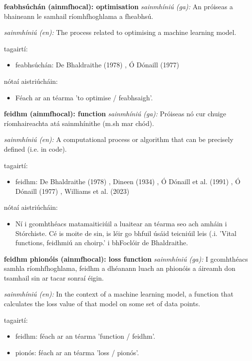 \documentclass{article}
\begin{document}
\textbf{feabhsúchán (ainmfhocal): optimisation}
\textit{sainmhíniú (ga):} An próiseas a bhaineann le samhail ríomhfhoghlama a fheabhsú.

\textit{sainmhíniú (en):} The process related to optimising a machine learning model.

tagairtí:
\begin{itemize}
	\item feabhsúchán: De Bhaldraithe (1978) \cite{de-bhaldraithe}, Ó Dónaill (1977) \cite{odonaill}
\end{itemize}

nótaí aistriúcháin:
\begin{itemize}
	\item Féach ar an téarma 'to optimise / feabhsaigh'.
\end{itemize}


\textbf{feidhm (ainmfhocal): function}
\textit{sainmhíniú (ga):} Próiseas nó cur chuige ríomhaireachta atá sainmhínithe (m.sh mar chód).

\textit{sainmhíniú (en):} A computational process or algorithm that can be precisely defined (i.e. in code).

tagairtí:
\begin{itemize}
	\item feidhm: De Bhaldraithe (1978) \cite{de-bhaldraithe}, Dineen (1934) \cite{dineen}, Ó Dónaill et al. (1991) \cite{focloir-beag}, Ó Dónaill (1977) \cite{odonaill}, Williams et al. (2023) \cite{storchiste}
\end{itemize}

nótaí aistriúcháin:
\begin{itemize}
	\item Ní i gcomhthéacs matamaiticiúil a luaitear an téarma seo ach amháin i Stórchiste. Cé is moite de sin, is léir go bhfuil úsáid teicniúil leis (.i. 'Vital functions, feidhmiú an choirp.' i bhFoclóir de Bhaldraithe.
\end{itemize}


\textbf{feidhm phionóis (ainmfhocal): loss function}
\textit{sainmhíniú (ga):} I gcomhthéacs samhla ríomhfhoghlama, feidhm a dhéanann luach an phionóis a áireamh don tsamhail sin ar tacar sonraí éigin.

\textit{sainmhíniú (en):} In the context of a machine learning model, a function that calculates the loss value of that model on some set of data points.

tagairtí:
\begin{itemize}
	\item feidhm: féach ar an téarma 'function / feidhm'.
	\item pionós: féach ar an téarma 'loss / pionós'.
\end{itemize}
\end{document}
